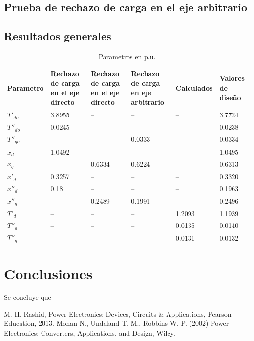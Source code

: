 \documentclass[conference]{IEEEtran}
\begin{document}
\subsection{Prueba de rechazo de carga en el eje arbitrario}

\subsection{Resultados generales}


\setlength{\extrarowheight}{2pt} %
\begin{table}[ht]
\centering
\caption{Parametros en p.u.}
\setlength{\tabcolsep}{6pt}
\begin{tabular}{C{1cm} C{1cm} C{1cm} C{1cm} C{1cm} C{1.25cm}}
\toprule
\textbf{Parametro} &
\textbf{Rechazo de carga en el eje directo} &
\textbf{Rechazo de carga en el eje directo} &
\textbf{Rechazo de carga en eje arbitrario} &
\textbf{Calculados} & 
\textbf{Valores de diseño} \\
\hline
\midrule
$T'_{do}$ & 3.8955 & --     & --     & --     & 3.7724 \\
$T''_{do}$ & 0.0245 & --     & --     & --     & 0.0238 \\
$T''_{qo}$ & --     & --     & 0.0333 & --     & 0.0334 \\
$x_d$ & 1.0492 & --     & --     & --     & 1.0495 \\
$x_q$ & --     & 0.6334 & 0.6224 & --     & 0.6313 \\
$x'_d$ & 0.3257 & --     & --     & --     & 0.3320 \\
$x''_d$ & 0.18 & --     & --     & --     & 0.1963 \\
$x''_q$ & --     & 0.2489 & 0.1991 & --     & 0.2496 \\
$T'_d$ & --     & --     & --     & 1.2093 & 1.1939 \\
$T''_d$ & --     & --     & --     & 0.0135 & 0.0140 \\
$T''_q$ & --     & --     & --     & 0.0131 & 0.0132 \\
\bottomrule
\end{tabular}
\end{table}


\section{Conclusiones}
Se concluye que 

\begin{thebibliography}{plain}
 M. H. Rashid, Power Electronics: Devices, Circuits \& Applications, Pearson Education, 2013.
 Mohan N., Undeland T. M., Robbins W. P. (2002) Power Electronics: Converters, Applications, and Design, Wiley.
\end{thebibliography}
\end{document}
